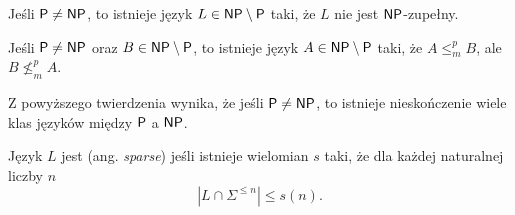\begin{theorem}[Ladnera]
    Jeśli $\textsf{P} \neq \textsf{NP}$, to istnieje język $L \in \textsf{NP} \setminus \textsf{P}$ taki, że $L$ nie jest $\textsf{NP}$-zupełny.
\end{theorem}

\begin{theorem}
    Jeśli $\textsf{P} \neq \textsf{NP}$ oraz $B \in \textsf{NP} \setminus \textsf{P}$, to istnieje język $A \in \textsf{NP} \setminus \textsf{P}$ taki, że $A \leq_m^p B$, ale $B \nleq_m^p A$.
\end{theorem}

Z powyższego twierdzenia wynika, że jeśli $\textsf{P} \neq \textsf{NP}$, to istnieje nieskończenie wiele klas języków między $\textsf{P}$ a $\textsf{NP}$.

\begin{definition}\label{d:sparse}
    Język $L$ jest  (ang. \textit{sparse}) jeśli istnieje wielomian $s$ taki, że dla każdej naturalnej liczby $n$
    \[ \left|L \cap \Sigma^{\leq n}\right| \leq s(n). \]
\end{definition}


